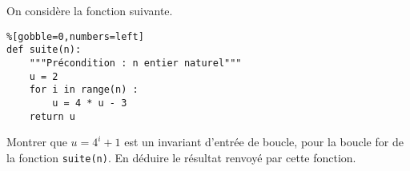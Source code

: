\exer{}
\setcounter{numques}{0}

On considère la fonction suivante.
\begin{lstlisting}%[gobble=0,numbers=left]
def suite(n):
    """Précondition : n entier naturel"""
    u = 2
    for i in range(n) : 
        u = 4 * u - 3 
    return u
\end{lstlisting}

\bigskip{}

\question{} Montrer que \og $u = 4^i + 1$ \fg{} est un invariant d'entrée de boucle, pour la boucle for de la fonction \texttt{suite(n)}. En déduire le résultat renvoyé par cette fonction. 